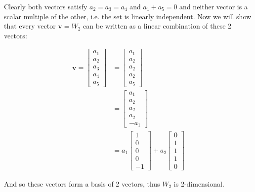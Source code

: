 \documentclass{article}
\renewcommand\vec{\mathbf}
\begin{document}
Clearly both vectors satisfy $a_2=a_3=a_4$ and $a_1+a_5=0$ and neither vector is a scalar multiple of the other, i.e. the set is linearly independent. Now we will show that every vector $\vec v=W_2$ can be written as a linear combination of these 2 vectors:

\begin{align*}
    \vec v=\begin{bmatrix}
        a_1\\a_2\\a_3\\a_4\\a_5
    \end{bmatrix}&=\begin{bmatrix}
        a_1\\a_2\\a_2\\a_2\\a_5
    \end{bmatrix}\tag{$a_2=a_3=a_4$}\\
    &=\begin{bmatrix}
        a_1\\a_2\\a_2\\a_2\\-a_1
    \end{bmatrix}\tag{$a_1+a_5=0$}\\
    &=a_1\begin{bmatrix}
        1\\0\\0\\0\\-1
    \end{bmatrix}+a_2\begin{bmatrix}
        0\\1\\1\\1\\0
    \end{bmatrix}
\end{align*}

And so these vectors form a basis of 2 vectors, thus $W_2$ is 2-dimensional.
\end{document}
